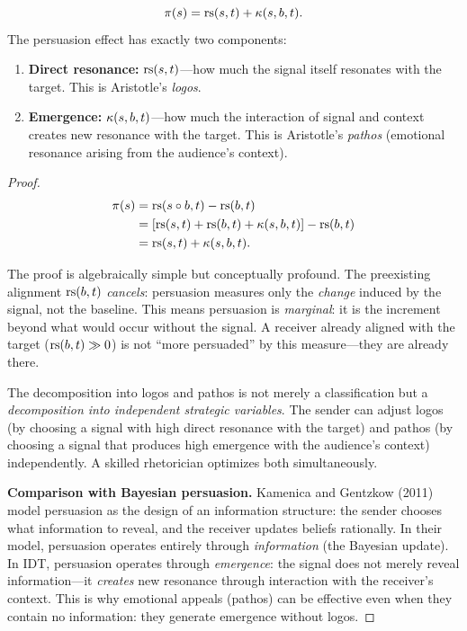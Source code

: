 \begin{theorem}
\label{thm:persuasion-decomp}
\[
\pi(s) = \mathrm{rs}(s, t) + \kappa(s, b, t).
\]
The persuasion effect has exactly two components:
\begin{enumerate}
\item \textbf{Direct resonance:} $\mathrm{rs}(s, t)$---how much the signal itself
resonates with the target. This is Aristotle's \emph{logos}.
\item \textbf{Emergence:} $\kappa(s, b, t)$---how much the interaction of
signal and context creates new resonance with the target. This is
Aristotle's \emph{pathos} (emotional resonance arising from the
audience's context).
\end{enumerate}
\end{theorem}

\begin{proof}
\begin{align*}
\pi(s) &= \mathrm{rs}(s \circ b, t) - \mathrm{rs}(b, t) \\
&= [\mathrm{rs}(s, t) + \mathrm{rs}(b, t) + \kappa(s, b, t)] - \mathrm{rs}(b, t) \\
&= \mathrm{rs}(s, t) + \kappa(s, b, t). \qedhere
\end{align*}

The proof is algebraically simple but conceptually profound. The
preexisting alignment $\mathrm{rs}(b, t)$ \emph{cancels}: persuasion measures
only the \emph{change} induced by the signal, not the baseline.
This means persuasion is \emph{marginal}: it is the increment beyond
what would occur without the signal. A receiver already aligned with
the target ($\mathrm{rs}(b, t) \gg 0$) is not ``more persuaded'' by this
measure---they are already there.

The decomposition into logos and pathos is not merely a classification
but a \emph{decomposition into independent strategic variables}. The
sender can adjust logos (by choosing a signal with high direct resonance
with the target) and pathos (by choosing a signal that produces
high emergence with the audience's context) independently. A skilled
rhetorician optimizes both simultaneously.

\textbf{Comparison with Bayesian persuasion.} Kamenica and Gentzkow
(2011) model persuasion as the design of an information structure:
the sender chooses what information to reveal, and the receiver
updates beliefs rationally. In their model, persuasion operates
entirely through \emph{information} (the Bayesian update). In IDT,
persuasion operates through \emph{emergence}: the signal does not
merely reveal information---it \emph{creates} new resonance through
interaction with the receiver's context. This is why emotional
appeals (pathos) can be effective even when they contain no
information: they generate emergence without logos.
\end{proof}

